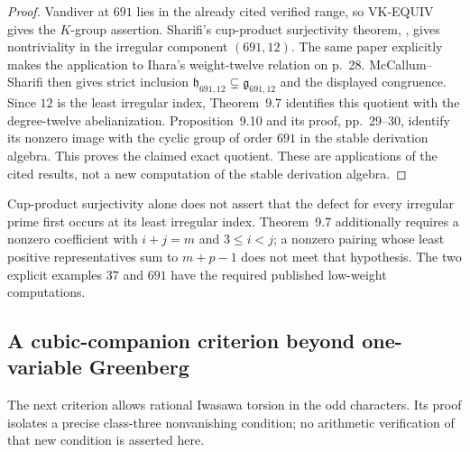 \documentclass[11pt,a4paper]{article}
\theoremstyle{definition}
\begin{document}
\begin{proof}
Vandiver at $691$ lies in the already cited verified range, so
VK-EQUIV gives the $K$-group assertion. Sharifi's cup-product
surjectivity theorem, \cite[Theorem~1.2, p.~2; Corollary~5.9,
p.~27]{Sharifi2007}, gives nontriviality in the irregular component
$(691,12)$. The same paper explicitly makes the application to
Ihara's weight-twelve relation on p.~28.
McCallum--Sharifi \cite[Theorem~9.11, p.~30]{McCallumSharifi2003}
then gives strict inclusion $\mathfrak h_{691,12}\subsetneq
\mathfrak g_{691,12}$ and the displayed congruence. Since $12$ is
the least irregular index, Theorem~9.7 identifies this quotient
with the degree-twelve abelianization. Proposition~9.10 and its
proof, pp.~29--30, identify its nonzero image with the cyclic
group of order $691$ in the stable derivation algebra. This proves
the claimed exact quotient. These are applications of the cited
results, not a new computation of the stable derivation algebra.
\end{proof}

Cup-product surjectivity alone does not assert that the defect for
every irregular prime first occurs at its least irregular index.
Theorem~9.7 additionally requires a nonzero coefficient with
$i+j=m$ and $3\le i<j$; a nonzero pairing whose least positive
representatives sum to $m+p-1$ does not meet that hypothesis.
The two explicit examples $37$ and $691$ have the required
published low-weight computations.

\subsection{A cubic-companion criterion beyond one-variable Greenberg}
\label{sec:odd-torsion-cubic}


The next criterion allows rational Iwasawa torsion in the odd characters.
Its proof isolates a precise class-three nonvanishing condition; no arithmetic
verification of that new condition is asserted here.
\end{document}
